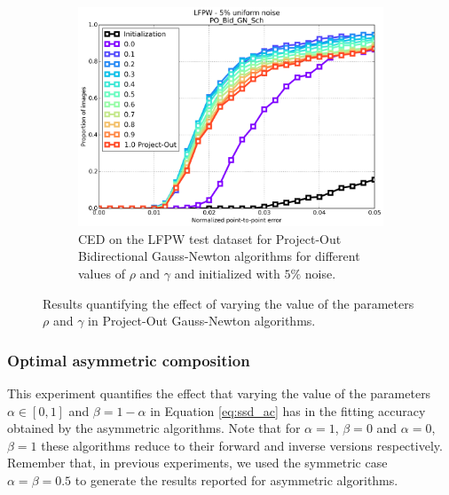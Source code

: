 \begin{figure}[h!]
	\begin{subfigure}{0.48\textwidth}
	    \includegraphics[width=\textwidth]{experiments/rho/ced_po_bid_gn_5.png}
	    \caption{CED on the LFPW test dataset for Project-Out Bidirectional Gauss-Newton algorithms for different values of $\rho$ and $\gamma$ and initialized with $5\%$ noise.}
	    \label{fig:ced_po_bid_gn}
	\end{subfigure}
	\caption{Results quantifying the effect of varying the value of the parameters $\rho$ and $\gamma$ in Project-Out Gauss-Newton algorithms.}
	\label{fig:rho}
\end{figure}



\subsubsection{Optimal asymmetric composition}

This experiment quantifies the effect that varying the value of the parameters $\alpha \in [0, 1]$ and $\beta = 1 -\alpha$ in Equation \ref{eq:ssd_ac} has in the fitting accuracy obtained by the asymmetric algorithms. Note that for $\alpha=1$, $\beta=0$ and $\alpha=0$, $\beta=1$ these algorithms reduce to their forward and inverse versions respectively. Remember that, in previous experiments, we used the symmetric case $\alpha=\beta=0.5$ to generate the results reported for asymmetric algorithms.

